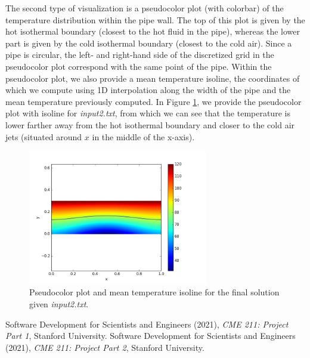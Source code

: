 \documentclass[12pt, a4paper]{article}
\begin{document}
The second type of visualization is a pseudocolor plot (with colorbar) 
of the temperature distribution within the pipe wall. The top of this 
plot is given by the hot isothermal boundary (closest to the hot fluid 
in the pipe), whereas the lower part is given by the cold isothermal 
boundary (closest to the cold air). Since a pipe is circular, the left- 
and right-hand side of the discretized grid in the pseudocolor plot 
correspond with the same point of the pipe. Within the pseudocolor 
plot, we also provide a mean temperature isoline, the coordinates of 
which we compute using 1D interpolation along the width of the pipe 
and the mean temperature previously computed. In Figure \ref{Fig: viz-plot}, 
we provide the pseudocolor plot with isoline for \textit{input2.txt}, from
which we can see that the temperature is lower farther away from the hot 
isothermal boundary and closer to the cold air jets (situated around $x$
in the middle of the x-axis). 

\begin{figure}[H]
    \centering
    \includegraphics[width=0.7\textwidth]{Plot_input2.png}
    \caption{Pseudocolor plot and mean temperature isoline for the 
    final solution given \textit{input2.txt}.}
    \label{Fig: viz-plot}
\end{figure}

\begin{thebibliography}{99}
Software Development for Scientists and Engineers (2021), 
\emph{CME 211: Project Part 1}, Stanford University.
Software Development for Scientists and Engineers (2021), 
\emph{CME 211: Project Part 2}, Stanford University.

\end{thebibliography}
\end{document}
